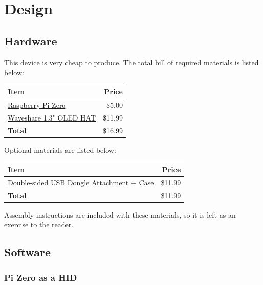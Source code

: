 \documentclass{article}
\begin{document}
\section{Design}

\subsection{Hardware}

This device is very cheap to produce. The total bill of required materials is listed below:

\begin{center}
\begin{tabular}{| l | r |}
    \hline
    \textbf{Item} & \textbf{Price} \\
    \hline
    \href{https://www.raspberrypi.com/products/raspberry-pi-zero/}{Raspberry Pi Zero} & \$5.00 \\
    \href{https://www.waveshare.com/1.3inch-oled-hat.htm}{Waveshare 1.3" OLED HAT} & \$11.99 \\
    \hline
    \textbf{Total} & \$16.99 \\
    \hline
\end{tabular}
\end{center}

Optional materials are listed below:

\begin{center}
\begin{tabular}{| l | r |}
    \hline
    \textbf{Item} & \textbf{Price} \\
    \hline
    \href{https://www.amazon.com/iUniker-Expansion-Breakout-Raspberry-Inserted/dp/B07NKNBZYG/}{Double-sided USB Dongle Attachment + Case} & \$11.99 \\
    \hline
    \textbf{Total} & \$11.99 \\
    \hline
\end{tabular}
\end{center}

Assembly instructions are included with these materials, so it is left as an exercise to the reader.

\subsection{Software}

\subsubsection{Pi Zero as a HID}
\end{document}
